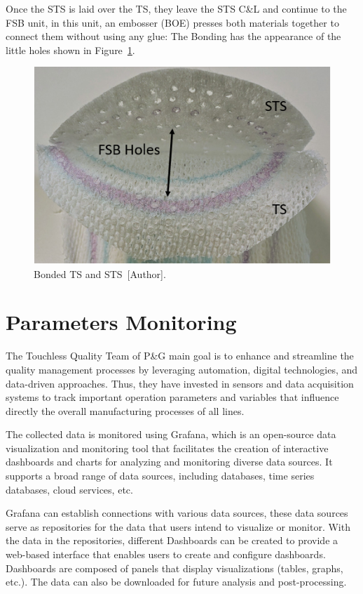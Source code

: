 Once the STS is laid over the TS, they leave the STS C\&L and continue to the FSB unit, in this unit, an embosser (BOE) presses both materials together to connect them without using any glue: The Bonding has the appearance of the little holes shown in Figure~\ref{fsb}.
\begin{figure}[H]
    \centering
    \includegraphics[width=0.8\linewidth]{FIGURES/fsb.png}
    \caption{Bonded TS and STS~[Author].}
    \label{fsb}
\end{figure}
\clearpage
\section{Parameters Monitoring}\label{sec2.2}

The Touchless Quality Team of P\&G main goal is to enhance and streamline the quality management processes by leveraging automation, digital technologies, and data-driven approaches. Thus, they have invested in sensors and data acquisition systems to track important operation parameters and variables that influence directly the overall manufacturing processes of all lines.  

The collected data is monitored using Grafana, which is an open-source data visualization and monitoring tool that facilitates the creation of interactive dashboards and charts for analyzing and monitoring diverse data sources. It supports a broad range of data sources, including databases, time series databases, cloud services, etc. 

Grafana can establish connections with various data sources, these data sources serve as repositories for the data that users intend to visualize or monitor. With the data in the repositories, different Dashboards can be created to provide a web-based interface that enables users to create and configure dashboards. Dashboards are composed of panels that display visualizations (tables, graphs, etc.). The data can also be downloaded for future analysis and post-processing. 

